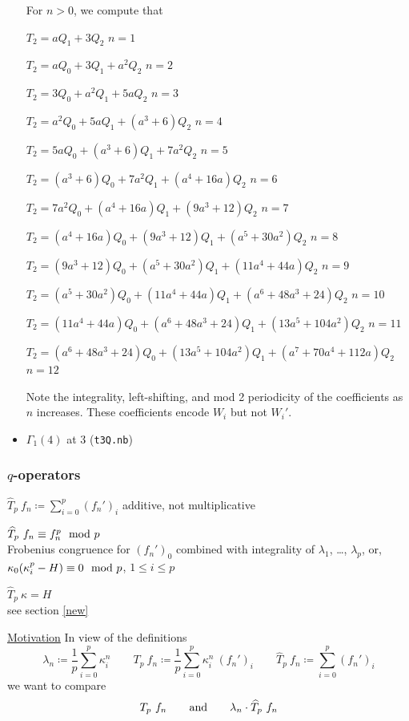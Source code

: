 \documentclass{rs}
\theoremstyle{definition}
\theoremstyle{remark}
\newcommand{\md}{~~{\rm mod}~}
\newcommand{\ad}{{\rm and}}
\newcommand{\G}{\Gamma}
\newcommand{\K}{\kappa}
\renewcommand{\l}{\lambda}
\newcommand{\ce}{\coloneqq}
\newcommand{\Ht}{\widehat{T}}
\renewcommand{\=}{\approx}
\renewcommand{\-}{\sim}
\numberwithin{equation}{section}
\numberwithin{thm}{section}
\begin{document}
\begin{itemize}
 For $n > 0$, we compute that 

 $T_2 = a Q_1 + 3 Q_2$ \hfill $n = 1$ 

 $T_2 = a Q_0 + 3 Q_1 + a^2 Q_2$ \hfill $n = 2$ 

 $T_2 = 3 Q_0 + a^2 Q_1 + 5 a Q_2$ \hfill $n = 3$ 

 $T_2 = a^2 Q_0 + 5 a Q_1 + (a^3 + 6) Q_2$ \hfill $n = 4$ 

 $T_2 = 5 a Q_0 + (a^3 + 6) Q_1 + 7 a^2 Q_2$ \hfill $n = 5$ 

 $T_2 = (a^3 + 6) Q_0 + 7 a^2 Q_1 + (a^4 + 16 a) Q_2$ \hfill $n = 6$ 

 $T_2 = 7 a^2 Q_0 + (a^4 + 16 a) Q_1 + (9 a^3 + 12) Q_2$ \hfill $n = 7$ 

 $T_2 = (a^4 + 16 a) Q_0 + (9 a^3 + 12) Q_1 + (a^5 + 30 a^2) Q_2$ \hfill $n = 8$ 

 $T_2 = (9 a^3 + 12) Q_0 + (a^5 + 30 a^2) Q_1 + (11 a^4 + 44 a) Q_2$ \hfill $n = 9$ 

 $T_2 = (a^5 + 30 a^2) Q_0 + (11 a^4 + 44 a) Q_1 + (a^6 + 48 a^3 + 24) Q_2$ \hfill $n = 10$ 

 $T_2 = (11 a^4 + 44 a) Q_0 + (a^6 + 48 a^3 + 24) Q_1 + (13 a^5 + 104 a^2) Q_2$ \hfill $n = 11$ 

 $T_2 = (a^6 + 48 a^3 + 24) Q_0 + (13 a^5 + 104 a^2) Q_1 + (a^7 + 70 a^4 + 112 a) Q_2$ \hfill $n = 12$ 

 Note the integrality, left-shifting, and mod 2 periodicity of the coefficients as $n$ increases.  
 These coefficients encode $W_i$ but not $W_i'$.  

 \item $\G_1(4)$ at 3 (\texttt{t3Q.nb}) 
\end{itemize}


\subsubsection{$q$-operators}

$\displaystyle \Ht_p ~ f_n \ce \sum_{i=0}^p (f_n')_i $ \qquad\qquad additive, not multiplicative 

$\Ht_p ~ f_n \equiv f_n^p \md p$ \\
Frobenius congruence for $(f_n')_0$ combined with integrality of $\l_1$, \ldots, $\l_p$, 
or, $\K_0 (\K_i^p - H) \equiv 0 \md p$, $1 \leq i \leq p$ 

$\Ht_p ~ \K = H$ \\
see section \ref{new} 

\underline{Motivation} \quad
In view of the definitions 
\[
 \l_n \ce \frac{1}{p} \sum_{i=0}^p \K_i^n \qquad T_p ~ f_n \ce \frac{1}{p} \sum_{i=0}^p \K_i^n ~ (f_n')_i \qquad \Ht_p ~ f_n \ce \sum_{i=0}^p (f_n')_i 
\]
we want to compare 
\[
 T_p ~ f_n \qquad \ad \qquad \l_n \cdot \Ht_p ~ f_n 
\]
\end{document}
